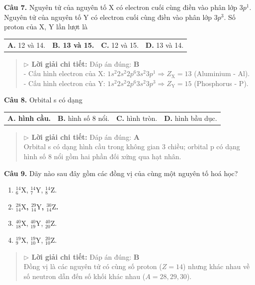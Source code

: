 \documentclass[11pt,a4paper]{article}
\begin{document}
\textbf{Câu 7.} Nguyên tử của nguyên tố X có electron cuối cùng điền vào phân lớp $3p^1$. Nguyên tử của nguyên tố Y có electron cuối cùng điền vào phân lớp $3p^3$. Số proton của X, Y lần lượt là
\begin{tabularx}{\textwidth}{@{}XXXX@{}}
\textbf{A.} 12 và 14. & \textbf{\color{red} B. 13 và 15.} & \textbf{C.} 12 và 15. & \textbf{D.} 13 và 14. \\
\end{tabularx}
\begin{quote}\small
{\color{myBlue}\textbf{$\triangleright$ Lời giải chi tiết:}} Đáp án đúng: \textbf{\color{red} B}\\
- Cấu hình electron của X: $1s^2 2s^2 2p^6 3s^2 3p^1 \Rightarrow Z_\text{X} = 13$ (Aluminium - Al).\\
- Cấu hình electron của Y: $1s^2 2s^2 2p^6 3s^2 3p^3 \Rightarrow Z_\text{Y} = 15$ (Phosphorus - P).
\end{quote}
\vspace{2pt}


\textbf{Câu 8.} Orbital s có dạng
\begin{tabularx}{\textwidth}{@{}XXXX@{}}
\textbf{\color{red} A. hình cầu.} & \textbf{B.} hình số 8 nổi. & \textbf{C.} hình tròn. & \textbf{D.} hình bầu dục. \\
\end{tabularx}
\begin{quote}\small
{\color{myBlue}\textbf{$\triangleright$ Lời giải chi tiết:}} Đáp án đúng: \textbf{\color{red} A}\\
Orbital s có dạng hình cầu trong không gian 3 chiều; orbital p có dạng hình số 8 nổi gồm hai phần đối xứng qua hạt nhân.
\end{quote}
\vspace{2pt}


\textbf{Câu 9.} Dãy nào sau đây gồm các đồng vị của cùng một nguyên tố hoá học?
\begin{enumerate}[label=\textbf{\Alph*.},leftmargin=*,itemsep=1pt,topsep=1pt]
\item $^{14}_6\text{X}$, $^{14}_7\text{Y}$, $^{14}_8\text{Z}$.
\item \textbf{\color{red} $^{28}_{14}\text{X}$, $^{29}_{14}\text{Y}$, $^{30}_{14}\text{Z}$.}
\item $^{40}_{18}\text{X}$, $^{40}_{19}\text{Y}$, $^{40}_{20}\text{Z}$.
\item $^{19}_9\text{X}$, $^{19}_{10}\text{Y}$, $^{20}_{10}\text{Z}$.
\end{enumerate}
\begin{quote}\small
{\color{myBlue}\textbf{$\triangleright$ Lời giải chi tiết:}} Đáp án đúng: \textbf{\color{red} B}\\
Đồng vị là các nguyên tử có cùng số proton ($Z = 14$) nhưng khác nhau về số neutron dẫn đến số khối khác nhau ($A = 28, 29, 30$).
\end{quote}
\vspace{2pt}
\end{document}
